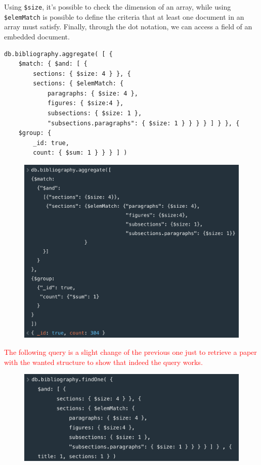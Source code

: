 \begin{enumerate}
    Using \verb|$size|, it's possible to check the dimension of an array, while using \verb|$elemMatch| is possible to define the criteria that at least one document in an array must satisfy.
    Finally, through the dot notation, we can access a field of an embedded document.
    \begin{lstlisting}[label={lst:query5mongodb}]
db.bibliography.aggregate( [ {
    $match: { $and: [ {
        sections: { $size: 4 } }, {
        sections: { $elemMatch: {
            paragraphs: { $size: 4 },
            figures: { $size:4 },
            subsections: { $size: 1 },
            "subsections.paragraphs": { $size: 1 } } } } ] } }, {
    $group: {
        _id: true,
        count: { $sum: 1 } } } ] )
    \end{lstlisting}
    \begin{figure}[H]
        \begin{center}
            \includegraphics[width=0.6\linewidth]{ImagesMongoDB/query5mongodb1}
            \label{fig:query5mongodb1}%
        \end{center}
    \end{figure}
    \textcolor{red}{The following query is a slight change of the previous one just to retrieve a paper with the wanted structure to show that indeed the query works.}
    \begin{figure}[H]
        \begin{center}
            \includegraphics[width=0.6\linewidth]{ImagesMongoDB/query5mongodb2}
            \label{fig:query5mongodb2}%
        \end{center}

\end{figure}
\end{enumerate}
